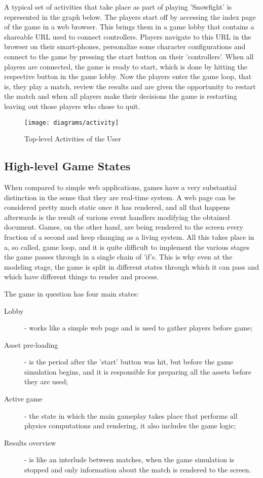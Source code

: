 A typical set of activities that take place as part of playing 'Snowfight' is
represented in the graph below. The players start off by accessing the index
page of the game in a web browser. This brings them in a game lobby that
contains a shareable URL used to connect controllers. Players navigate to this
URL in the browser on their smart-phones, personalize some character
configurations and connect to the game by pressing the start button on their
'controllers'. When all players are connected, the game is ready to start, which
is done by hitting the respective button in the game lobby. Now the players
enter the game loop, that is, they play a match, review the results and are
given the opportunity to restart the match and when all players make their
decisions the game is restarting leaving out those players who chose to quit.

\begin{figure}[!h]
\centering
\texttt{[image: diagrams/activity]}
\caption{Top-level Activities of the User}\label{diag:activity}
\end{figure}

\newpage

\subsection{High-level Game States}

When compared to simple web applications, games have a very substantial
distinction in the sense that they are real-time system. A web page can be
considered pretty much static once it has rendered, and all that happens
afterwards is the result of various event handlers modifying the obtained
document. Games, on the other hand, are being rendered to the screen every
fraction of a second and keep changing as a living system. All this takes place
in a, so called, game loop, and it is quite difficult to implement the various
stages the game passes through in a single chain of 'if's. This is why even at
the modeling stage, the game is split in different states through which it can
pass and which have different things to render and process.

The game in question has four main states:

\begin{description}
	\item [Lobby] - works like a simple web page and is used to gather players before game;
	\item [Asset pre-loading] - is the period after the 'start' button was hit, but before the game simulation begins, and it is responsible for preparing all the assets before they are used;
	\item [Active game] - the state in which the main gameplay takes place that performs all physics computations and rendering, it also includes the game logic;
	\item [Results overview] - is like an interlude between matches, when the game simulation is stopped and only information about the match is rendered to the screen.
\end{description}

